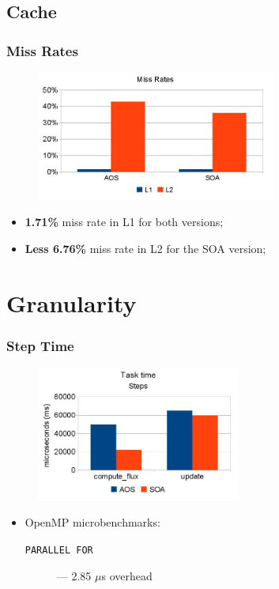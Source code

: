 \documentclass{beamer}
\begin{document}
\subsection{Cache}
\begin{frame}
	\frametitle{Miss Rates}
	\begin{figure}
		\begin{center}
			\includegraphics[width=0.7\textwidth]{images/slides.april/missrate.jpg}
		\end{center}
	\end{figure}
	\begin{itemize}
		\item{\textbf{1.71\%} miss rate in L1 for both versions;}
		\item{\textbf{Less 6.76\%} miss rate in L2 for the SOA version;}
	\end{itemize}
\end{frame}




\section{Granularity}
\begin{frame}
	\frametitle{Step Time}
	\begin{figure}
		\begin{center}
			\includegraphics[width=0.6\textwidth]{images/slides.april/steps.jpg}
		\end{center}
	\end{figure}
	\begin{itemize}
		\item{OpenMP microbenchmarks:
		\begin{description}
			\item[\texttt{PARALLEL FOR}]{--- 2.85 $\mu$s overhead}
		\end{description}
		}
	\end{itemize}
\end{frame}
\end{document}
